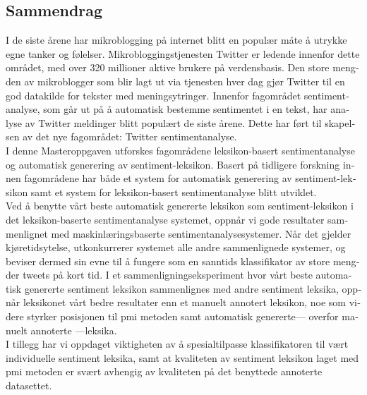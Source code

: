\begin{otherlanguage}{norsk}

\section*{Sammendrag}
I de siste årene har mikroblogging på internet blitt en populær måte å utrykke egne tanker og følelser. Mikrobloggingstjenesten Twitter er ledende innenfor dette området, med over 320 millioner aktive brukere på verdensbasis. Den store mengden av mikroblogger som blir lagt ut via tjenesten hver dag gjør Twitter til en god datakilde for tekster med meningsytringer. Innenfor fagområdet sentimentanalyse, som går ut på å automatisk bestemme sentimentet i en tekst, har analyse av Twitter meldinger blitt populært de siste årene. Dette har ført til skapelsen av det nye fagområdet: Twitter sentimentanalyse. \\

I denne Masteroppgaven utforskes fagområdene leksikon-basert sentimentanalyse og automatisk generering av sentiment-leksikon. Basert på tidligere forskning innen fagområdene har både et system for automatisk generering av sentiment-leksikon samt et system for leksikon-basert sentimentanalyse blitt utviklet. \\

Ved å benytte vårt beste automatisk genererte leksikon som sentiment-leksikon i det leksikon-baserte sentimentanalyse systemet, oppnår vi gode resultater sammenlignet med maskinlæringsbaserte sentimentanalysesystemer. Når det gjelder kjøretidsytelse, utkonkurrerer systemet alle andre sammenlignede systemer, og beviser dermed sin evne til å fungere som en sanntids klassifikator av store mengder tweets på kort tid. I et sammenlignings\-eksperiment hvor vårt beste automatisk genererte sentiment leksikon sammenlignes med andre sentiment leksika, oppnår leksikonet vårt bedre resultater enn et manuelt annotert leksikon, noe som videre styrker posisjonen til \ac{pmi} metoden samt automatisk genererte--- overfor manuelt annoterte ---leksika. \\

I tillegg har vi oppdaget viktigheten av å spesialtilpasse klassifikatoren til vært individuelle sentiment leksika, samt at kvaliteten av sentiment leksikon laget med \ac{pmi} metoden er svært avhengig av kvaliteten på det benyttede annoterte datasettet.


\end{otherlanguage}

\glsresetall
